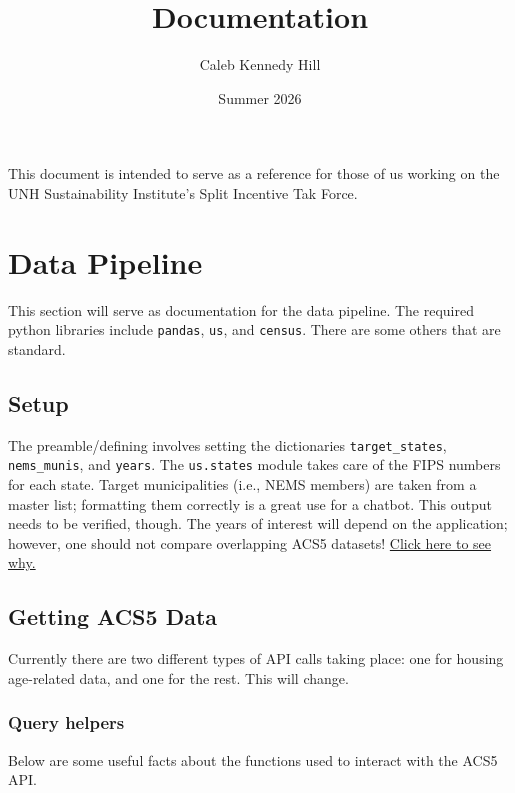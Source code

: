 \documentclass{article}
\title{Documentation}
\author{Caleb Kennedy Hill}
\date{Summer 2026}
\newcommand{\red}[1]{{\color{red}{#1}}}
\begin{document}
\maketitle


\red{TODO:
    \begin{itemize}
        \item Start metrics metadata
    \end{itemize}
}

This document is intended to serve as a reference for those of us working on the UNH 
Sustainability Institute's Split Incentive Tak Force.


\section{Data Pipeline}\label{sec:pipeline}

This section will serve as documentation for the data pipeline.
The required python libraries include \verb|pandas|, \verb|us|, and \verb|census|.
There are some others that are standard.


\subsection{Setup}
The preamble/defining involves setting the dictionaries \verb|target_states|,
\verb|nems_munis|, and \verb|years|.
The \verb|us.states| module takes care of the FIPS numbers for each state.
Target municipalities (i.e., NEMS members) are taken from a master list;
formatting them correctly is a great use for a chatbot.
This output needs to be verified, though.
The years of interest will depend on the application;
however, one should not compare overlapping ACS5 datasets!
\href{
    https://www.census.gov/newsroom/blogs/random-samplings/2022/03/period-estimates-american-community-survey.html
}{Click here to see why.}


\subsection{Getting ACS5 Data}
Currently there are two different types of API calls taking place: one for housing age-related data,
and one for the rest.
This will change.

\subsubsection*{Query helpers}
Below are some useful facts about the functions used to interact with the ACS5 API.
\end{document}
